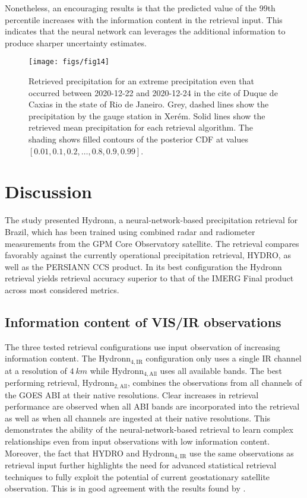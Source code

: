 \documentclass[journal abbreviation, manuscript]{copernicus}
\newcommand{\hydronntwo}{Hydronn$_{2, \text{All}}$}
\newcommand{\hydronnfourall}{Hydronn$_{4, \text{All}}$}
\newcommand{\hydronnfourir}{Hydronn$_{4, \text{IR}}$}
\begin{document}
Nonetheless, an encouraging results is that the predicted value of the 99th
percentile increases with the information content in the retrieval input. This
indicates that the neural network can leverages the additional information to
produce sharper uncertainty estimates.

\begin{figure}[!hbpt]
  \centering
  \texttt{[image: figs/fig14]}
  \caption{
    Retrieved precipitation for an extreme precipitation even that occurred between
    2020-12-22 and 2020-12-24 in the cite of Duque de Caxias in the
    state of Rio de Janeiro. Grey, dashed lines show the precipitation by the
    gauge station in Xer\'em. Solid lines show the retrieved mean precipitation
    for each retrieval algorithm. The shading shows filled contours of the
    posterior CDF at values $[0.01, 0.1, 0.2, \ldots, 0.8, 0.9, 0.99]$.
    }
  \label{fig:precipitation_case}
\end{figure}

\section{Discussion}

The study presented Hydronn, a neural-network-based precipitation retrieval for
Brazil, which has been trained using combined radar and radiometer measurements
from the GPM Core Observatory satellite. The retrieval compares favorably
against the currently operational precipitation retrieval, HYDRO, as well as the
PERSIANN CCS product. In its best configuration the Hydronn retrieval yields
retrieval accuracy superior to that of the IMERG Final product across most
considered metrics.

\subsection{Information content of VIS/IR observations}

The three tested retrieval configurations use input observation of increasing
information content. The \hydronnfourir{} configuration only uses a single IR
channel at a resolution of $4\ \unit{km}$ while \hydronnfourall{} uses all
available bands. The best performing retrieval, \hydronntwo{}, combines the
observations from all channels of the GOES ABI at their native resolutions.
Clear increases in retrieval performance are observed when all ABI bands are
incorporated into the retrieval as well as when all channels are ingested at
their native resolutions. This demonstrates the ability of the
neural-network-based retrieval to learn complex relationships even from input
observations with low information content. Moreover, the fact that HYDRO and
\hydronnfourir{} use the same observations as retrieval input further highlights
the need for advanced statistical retrieval techniques to fully exploit the
potential of current geostationary satellite observation. This is in good
agreement with the results found by \citet{sadeghi19}.
\end{document}
